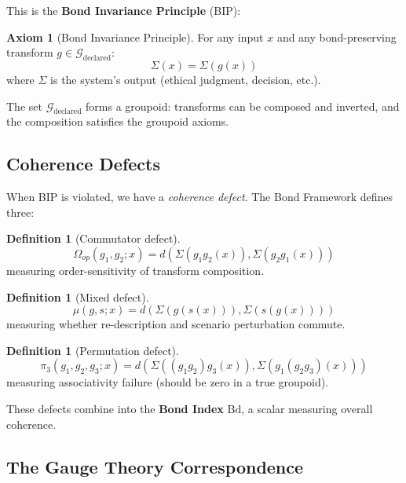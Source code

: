 \documentclass[12pt,letterpaper]{article}
\theoremstyle{definition}
\newtheorem{definition}[theorem]{Definition}
\newtheorem{axiom}{Axiom}
\theoremstyle{remark}
\newcommand{\G}{\mathcal{G}}
\begin{document}
This is the \textbf{Bond Invariance Principle} (BIP):

\begin{axiom}[Bond Invariance Principle]
For any input $x$ and any bond-preserving transform $g \in \G_{\text{declared}}$:
\begin{equation}
\Sigma(x) = \Sigma(g(x))
\end{equation}
where $\Sigma$ is the system's output (ethical judgment, decision, etc.).
\end{axiom}

The set $\G_{\text{declared}}$ forms a groupoid: transforms can be composed and inverted, and the composition satisfies the groupoid axioms.

\subsection{Coherence Defects}

When BIP is violated, we have a \textit{coherence defect}. The Bond Framework defines three:

\begin{definition}[Commutator defect]
\begin{equation}
\Omega_{op}(g_1, g_2; x) = d(\Sigma(g_1 g_2 (x)), \Sigma(g_2 g_1 (x)))
\end{equation}
measuring order-sensitivity of transform composition.
\end{definition}

\begin{definition}[Mixed defect]
\begin{equation}
\mu(g, s; x) = d(\Sigma(g(s(x))), \Sigma(s(g(x))))
\end{equation}
measuring whether re-description and scenario perturbation commute.
\end{definition}

\begin{definition}[Permutation defect]
\begin{equation}
\pi_3(g_1, g_2, g_3; x) = d(\Sigma((g_1 g_2) g_3(x)), \Sigma(g_1 (g_2 g_3)(x)))
\end{equation}
measuring associativity failure (should be zero in a true groupoid).
\end{definition}

These defects combine into the \textbf{Bond Index} $\text{Bd}$, a scalar measuring overall coherence.

\subsection{The Gauge Theory Correspondence}
\end{document}
